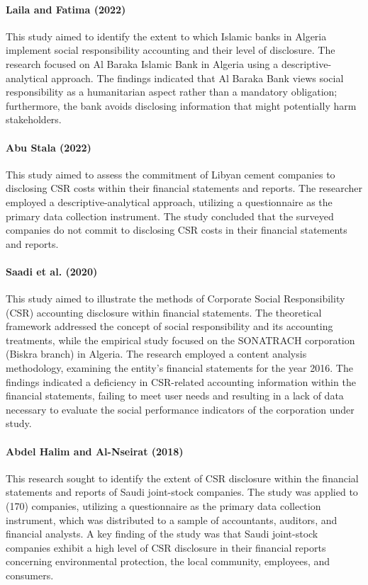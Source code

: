 \documentclass[10pt]{NSP1}
\begin{document}
	\paragraph{Laila and Fatima (2022) \cite{Laila2022}} This study aimed to identify the extent to which Islamic banks in Algeria implement social responsibility accounting and their level of disclosure. The research focused on Al Baraka Islamic Bank in Algeria using a descriptive-analytical approach. The findings indicated that Al Baraka Bank views social responsibility as a humanitarian aspect rather than a mandatory obligation; furthermore, the bank avoids disclosing information that might potentially harm stakeholders.
	
	\paragraph{Abu Stala (2022) \cite{AbuStala2022}} This study aimed to assess the commitment of Libyan cement companies to disclosing CSR costs within their financial statements and reports. The researcher employed a descriptive-analytical approach, utilizing a questionnaire as the primary data collection instrument. The study concluded that the surveyed companies do not commit to disclosing CSR costs in their financial statements and reports.
	
	\paragraph{Saadi et al. (2020) \cite{Saadi2020}} This study aimed to illustrate the methods of Corporate Social Responsibility (CSR) accounting disclosure within financial statements. The theoretical framework addressed the concept of social responsibility and its accounting treatments, while the empirical study focused on the SONATRACH corporation (Biskra branch) in Algeria. The research employed a content analysis methodology, examining the entity's financial statements for the year 2016. The findings indicated a deficiency in CSR-related accounting information within the financial statements, failing to meet user needs and resulting in a lack of data necessary to evaluate the social performance indicators of the corporation under study.
	
	\paragraph{Abdel Halim and Al-Nseirat (2018) \cite{AbdelHalim2018}} This research sought to identify the extent of CSR disclosure within the financial statements and reports of Saudi joint-stock companies. The study was applied to (170) companies, utilizing a questionnaire as the primary data collection instrument, which was distributed to a sample of accountants, auditors, and financial analysts. A key finding of the study was that Saudi joint-stock companies exhibit a high level of CSR disclosure in their financial reports concerning environmental protection, the local community, employees, and consumers.
	
\end{document}
